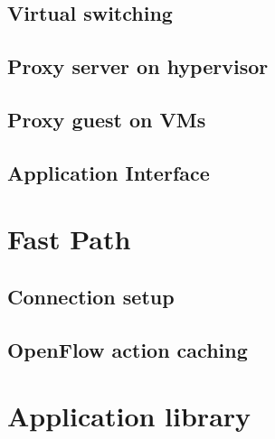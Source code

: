 \subsection{Virtual switching}
\subsection{Proxy server on hypervisor}
\subsection{Proxy guest on VMs}
\subsection{Application Interface}

\section{Fast Path}
\subsection{Connection setup}
\subsection{OpenFlow action caching}

\section{Application library}